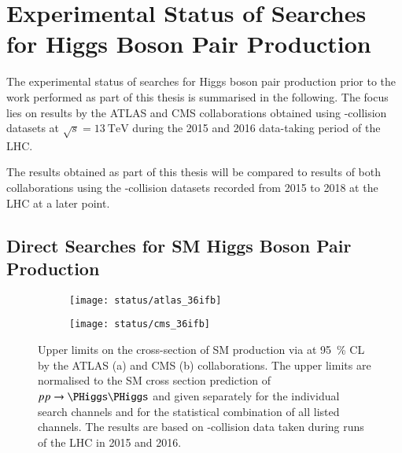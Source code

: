 \section{Experimental Status of Searches for Higgs Boson Pair Production}%
\label{seq:experimental_status}

The experimental status of searches for Higgs boson pair production prior to the
work performed as part of this thesis is summarised in the following. The focus
lies on results by the ATLAS and CMS collaborations obtained using \pp-collision
datasets at $\sqrt{s} = \SI{13}{\TeV}$ during the 2015 and 2016 data-taking
period of the LHC.

The results obtained as part of this thesis will be compared to results of both
collaborations using the \pp-collision datasets recorded from 2015 to 2018 at
the LHC at a later point.


\subsection{Direct Searches for SM Higgs Boson Pair Production}


\begin{figure}[htbp]
  \centering

  \begin{subfigure}[b]{0.48\textwidth}
    \centering

    \texttt{[image: status/atlas\_36ifb]}

  \end{subfigure}\hfill%
  \begin{subfigure}[b]{0.48\textwidth}
    \centering

    \texttt{[image: status/cms\_36ifb]}

  \end{subfigure}

  \caption{Upper limits on the cross-section of SM \HH production via \ggF at
    \SI{95}{\percent} CL by the ATLAS (a) and CMS (b) collaborations. The upper
    limits are normalised to the SM cross section prediction of $\pp \to \HH$
    and given separately for the individual search channels and for the
    statistical combination of all listed channels. The results are based on
    \pp-collision data taken during runs of the LHC in 2015 and 2016.}%
  \label{fig:prior_status}
\end{figure}



